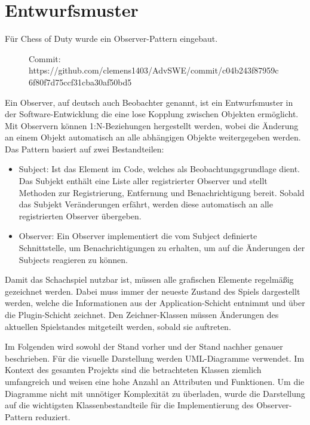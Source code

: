 \chapter{Entwurfsmuster}

Für \glqq Chess of Duty\grqq{} wurde ein Observer-Pattern eingebaut.

\begin{figure}[h!]
    Commit:  \scriptsize https://github.com/clemens1403/AdvSWE/commit/c04b243f87959c6f80f7d75ccf31cba30af50bd5
\end{figure}

Ein Observer, auf deutsch auch Beobachter genannt, ist ein Entwurfsmuster in der Software-Entwicklung die eine lose Kopplung zwischen Objekten ermöglicht.
Mit Observern können 1:N-Beziehungen hergestellt werden, wobei die Änderung an einem Objekt automatisch an alle abhängigen Objekte weitergegeben werden.
Das Pattern basiert auf zwei Bestandteilen:

\begin{itemize}
    \item Subject: Ist das Element im Code, welches als Beobachtungsgrundlage dient. 
    Das Subjekt enthält eine Liste aller registrierter Observer und stellt Methoden zur Registrierung, Entfernung und Benachrichtigung bereit. 
    Sobald das Subjekt Veränderungen erfährt, werden diese automatisch an alle registrierten Observer übergeben.
    \item Observer: Ein Observer implementiert die vom Subject definierte Schnittstelle, um Benachrichtigungen zu erhalten, um auf die Änderungen  der Subjects reagieren zu können.
\end{itemize}

Damit das Schachspiel nutzbar ist, müssen alle grafischen Elemente regelmäßig gezeichnet werden.
Dabei muss immer der neueste Zustand des Spiels dargestellt werden, welche die Informationen aus der Application-Schicht entnimmt und über die Plugin-Schicht zeichnet. 
Den Zeichner-Klassen müssen Änderungen des aktuellen Spielstandes mitgeteilt werden, sobald sie auftreten.

Im Folgenden wird sowohl der Stand vorher und der Stand nachher genauer beschrieben. 
Für die visuelle Darstellung werden UML-Diagramme verwendet. 
Im Kontext des gesamten Projekts sind die betrachteten Klassen ziemlich umfangreich und weisen eine hohe Anzahl an Attributen und Funktionen.
Um die Diagramme nicht mit unnötiger Komplexität zu überladen, wurde die Darstellung auf die wichtigsten Klassenbestandteile für die Implementierung des Observer-Pattern reduziert. 

